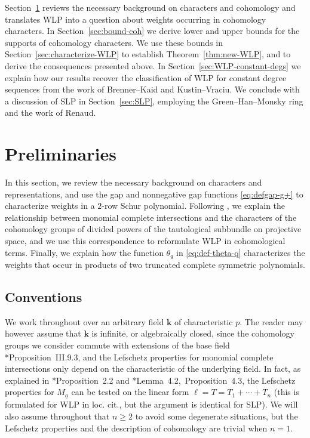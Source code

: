 \documentclass[11pt,reqno]{amsart}
\def\kk{{\mathbf k}}
\newcommand{\ul}[1]{\underline{#1}}
\theoremstyle{definition}
\theoremstyle{remark}
\numberwithin{equation}{section}
\begin{document}
\medskip

 Section~\ref{sec:prelim} reviews the necessary background on characters and cohomology and translates WLP into a question about weights occurring in cohomology
characters. In Section~\ref{sec:bound-coh} we derive lower and upper bounds for the supports of cohomology characters. We use these bounds in Section~\ref{sec:characterize-WLP} to establish Theorem~\ref{thm:new-WLP}, and to derive the consequences presented above. In Section~\ref{sec:WLP-constant-degs} we explain how our results recover the classification of WLP for constant degree sequences from the work of Brenner--Kaid and Kustin--Vraciu. We conclude with a discussion of SLP in Section~\ref{sec:SLP}, employing the Green--Han--Monsky ring and the work of Renaud.


\section{Preliminaries}
\label{sec:prelim}

In this section, we review the necessary background on characters and representations, and use the gap and nonnegative gap functions \eqref{eq:defgap-g+} to characterize weights in a $2$-row Schur polynomial. Following \cite{KMRR}, we explain the relationship between monomial complete intersections and the characters of the cohomology groups of divided powers of the tautological subbundle on projective space, and we use this correspondence to reformulate WLP in cohomological terms. Finally, we explain how the function $\theta_q$ in \eqref{eq:def-theta-q} characterizes the weights that occur in products of two truncated complete symmetric polynomials.

\subsection{Conventions}
\label{subsec:conventions}
We work throughout over an arbitrary field $\kk$ of characteristic $p$. The reader may however assume that $\kk$ is infinite, or algebraically closed, since the cohomology groups we consider commute with extensions of the base field \cite{hartshorne}*{Proposition~III.9.3}, and the Lefschetz properties for monomial complete intersections only depend on the characteristic of the underlying field. In fact, as explained in \cite{MMN}*{Proposition~2.2} and \cite{lund-nick}*{Lemma~4.2,~Proposition~4.3}, the Lefschetz properties for $M_{\ul{a}}$ can be tested on the linear form $\ell = T = T_1+\cdots +T_n$ (this is formulated for WLP in loc. cit., but the argument is identical for SLP).  We will also assume throughout that $n\geq 2$ to avoid some degenerate situations, but the Lefschetz properties and the description of cohomology are trivial when $n=1$.
\end{document}

